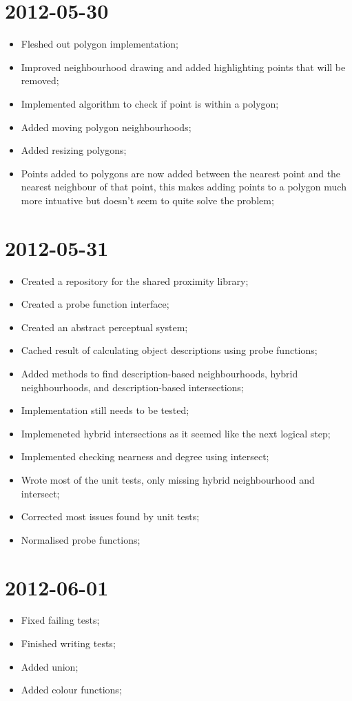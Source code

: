 \documentclass{report}
\begin{document}
\section*{2012-05-30}
\begin{itemize}
  \item 
    Fleshed out polygon implementation;
  \item
    Improved neighbourhood drawing and added highlighting points that will be removed;
  \item
    Implemented algorithm to check if point is within a polygon;
  \item
    Added moving polygon neighbourhoods;
  \item
    Added resizing polygons;
  \item
    Points added to polygons are now added between the nearest point and the nearest neighbour of that point, this makes adding points to a polygon much more intuative but doesn't seem to quite solve the problem;
\end{itemize}

\section*{2012-05-31}
\begin{itemize}
  \item 
    Created a repository for the shared proximity library;
  \item
    Created a probe function interface;
  \item
    Created an abstract perceptual system;
  \item
    Cached result of calculating object descriptions using probe functions;
  \item
    Added methods to find description-based neighbourhoods, hybrid neighbourhoods, and description-based intersections;
  \item
    Implementation still needs to be tested;
  \item
    Implemeneted hybrid intersections as it seemed like the next logical step;
  \item
    Implemented checking nearness and degree using intersect;
  \item
    Wrote most of the unit tests, only missing hybrid neighbourhood and intersect;
  \item
    Corrected most issues found by unit tests;
  \item
    Normalised probe functions;
\end{itemize}

\section*{2012-06-01}
\begin{itemize}
  \item 
    Fixed failing tests;
  \item
    Finished writing tests;
  \item
    Added union;
  \item
    Added colour functions;
\end{itemize}
\end{document}
